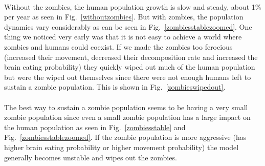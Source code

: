 \documentclass{article}
\begin{document}
\paragraph{}
Without the zombies, the human population growth is slow and steady, about 1\% per year as seen in Fig.~\ref{withoutzombies}. But with zombies, the population dynamics vary considerably as can be seen in Fig.~\ref{zombiesstablezoomed}. One thing we noticed very early was that it is not easy to achieve a world where zombies and humans could coexist. If we made the zombies too ferocious (increased their movement, decreased their decomposition rate and increased the brain eating probability) they quickly wiped out much of the human population but were the wiped out themselves since there were not enough humans left to sustain a zombie population. This is shown in Fig.~\ref{zombieswipedout}.

\paragraph{}
The best way to sustain a zombie population seems to be having a very small zombie population since even a small zombie population has a large impact on the human population as seen in Fig.~\ref{zombiesstable} and Fig.~\ref{zombiesstablezoomed}. If the zombie population is more aggressive (has higher brain eating probability or higher movement probability) the model generally becomes unstable and wipes out the zombies.
\end{document}

